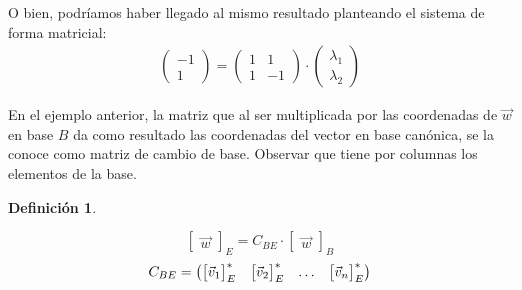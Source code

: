 \documentclass[a5paper,12pt,twoside]{book}
\newtheorem{defn}{{Definición}}[chapter]
\begin{document}
\begin{mdframed}[style=MyFrame2]
    O bien, podríamos haber llegado al mismo resultado planteando el sistema de forma matricial:
    \begin{gather*}
        \begin{pmatrix}
            -1
            \\
            1
        \end{pmatrix}
        =
        \begin{pmatrix}
            1 & 1
            \\
            1 & -1
        \end{pmatrix}
        \cdot
        \begin{pmatrix}
            \lambda_1
            \\
            \lambda_2
        \end{pmatrix}
    \end{gather*}
\end{mdframed}

En el ejemplo anterior, la matriz que al ser multiplicada por las coordenadas de $\Vec{w}$ en base $B$ da como resultado las coordenadas del vector en base canónica, se la conoce como matriz de cambio de base. Observar que tiene por columnas los elementos de la base.

\begin{mdframed}[style=MyFrame1]
    \begin{defn}
        \label{defn:C_BE}
    \end{defn}
    \begin{equation*}
        \begin{bmatrix}
            \Vec{w}
        \end{bmatrix}_E
        = C_{BE} \cdot
        \begin{bmatrix}
            \Vec{w}
        \end{bmatrix}_B
    \end{equation*}
    \begin{equation*}
        C_{BE} =
        \begin{pmatrix}
            { \begin{bmatrix} \Vec{v}_1 \end{bmatrix} }_E^* & { \begin{bmatrix} \Vec{v}_2 \end{bmatrix} }_E^* & \dots & { \begin{bmatrix} \Vec{v}_n \end{bmatrix} }_E^*
        \end{pmatrix}
    \end{equation*}
\end{mdframed}
\end{document}

